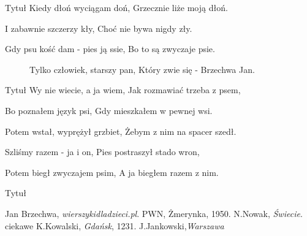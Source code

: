 \documentclass{beamer}
\begin{document}
\begin{frame}{Tytuł}
Kiedy dłoń wyciągam doń,
Grzecznie liże moją dłoń.

I zabawnie szczerzy kły,
Choć nie bywa nigdy zły.

Gdy psu kość dam - pies ją ssie,
Bo to są zwyczaje psie.
\begin{figure}
    \centering

    \caption{Tylko człowiek, starszy pan,
Który zwie się - Brzechwa Jan.}
    \label{fig:Gdy psu kość dam - pies ją ssie,
Bo to są zwyczaje psie.}
\end{figure}
\end{frame}
\begin{frame}{Tytuł}
Wy nie wiecie, a ja wiem,
Jak rozmawiać trzeba z psem,

Bo poznałem język psi,
Gdy mieszkałem w pewnej wsi.
\begin{figure}
    \centering

  
    \label{fig:Co jest lepsze? Ręce cztery?
Cztery nogi? Będę szczery}
\end{figure}
Potem wstał, wyprężył grzbiet,
Żebym z nim na spacer szedł.

Szliśmy razem - ja i on,
Pies postraszył stado wron,

Potem biegł zwyczajem psim,
A ja biegłem razem z nim.
\end{frame}

\begin{frame}{Tytuł}
\begin{thebibliography}{szacunek}



 Jan Brzechwa,
\textit{ wierszykidladzieci.pl}.
PWN, Żmerynka, 1950.
N.Nowak,
\textit{Świecie}.
ciekawe
K.Kowalski, \textit{Gdańsk}, 
1231.
J.Jankowski,\textit{Warszawa}

\end{thebibliography}{}

 \end{frame}

 
 
\end{document}
